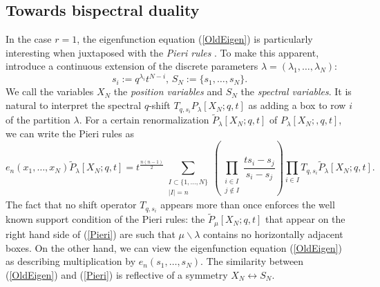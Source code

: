 \documentclass{amsart}
\theoremstyle{remark}
\numberwithin{thm}{section}
\numberwithin{equation}{section}
\begin{document}
\subsection{Towards bispectral duality}\label{Duality}
In the case $r=1$, the eigenfunction equation (\ref{OldEigen}) is particularly interesting when juxtaposed with the \textit{Pieri rules} \cite{Mac}.
To make this apparent, introduce a continuous extension of the discrete parameters $\lambda=(\lambda_1,\ldots,\lambda_{N})$:
\[
s_i:=q^{\lambda_i}t^{N-i},\, S_N:=\{s_1,\ldots, s_N\}.
\]
We call the variables $X_N$ the \textit{position variables} and $S_N$ the \textit{spectral variables}.
It is natural to interpret the spectral $q$-shift $T_{q,s_i}P_\lambda[X_N;q,t]$ as adding a box to row $i$ of the partition $\lambda$.
For a certain renormalization $\tilde{P}_\lambda[X_N;q,t]$ of $P_{\lambda}[X_{N};,q,t]$, we can write the Pieri rules as
\begin{equation}
e_n(x_1,\ldots, x_N)\tilde{P}_\lambda[X_N ;q,t]
=t^{\frac{n(n-1)}{2}}\sum_{\substack{I\subset\{1,\ldots, N\}\\|I|=n}}\left(\prod_{\substack{i\in I\\j\not\in I}}\frac{ts_i-s_j}{s_i-s_j}\right)\prod_{i\in I} T_{q,s_i}\tilde{P}_\lambda[X_{N} ;q,t].
\label{Pieri}
\end{equation}
The fact that no shift operator $T_{q,s_i}$ appears more than once enforces the well known support condition of the Pieri rules: the $\tilde{P}_\mu[X_N;q,t]$ that appear on the right hand side of (\ref{Pieri}) are such that $\mu\backslash\lambda$ contains no horizontally adjacent boxes.
On the other hand, we can view the eigenfunction equation (\ref{OldEigen}) as describing multiplication by $e_n(s_1,\ldots, s_N)$.
The similarity between (\ref{OldEigen}) and (\ref{Pieri}) is reflective of a symmetry $X_N\leftrightarrow S_N$.
\end{document}
